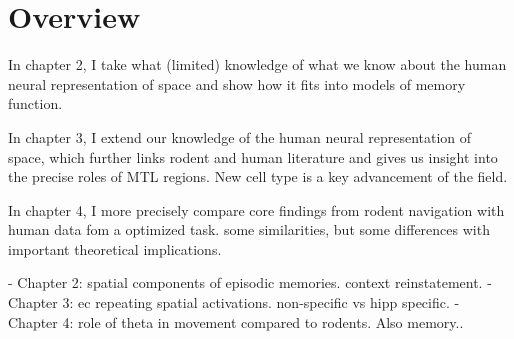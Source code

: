 \section{Overview}

In chapter 2, I take what (limited) knowledge of what we know about the human neural representation of space and show how it fits into models of memory function.

In chapter 3, I extend our knowledge of the human neural representation of space, which further links rodent and human literature and gives us insight into the precise roles of MTL regions. New cell type is a key advancement of the field.

In chapter 4, I more precisely compare core findings from rodent navigation with human data fom a optimized task. some similarities, but some differences with important theoretical implications.

- Chapter 2: spatial components of episodic memories. context reinstatement.
- Chapter 3: ec repeating spatial activations. non-specific vs hipp specific.
- Chapter 4: role of theta in movement compared to rodents. Also memory..
